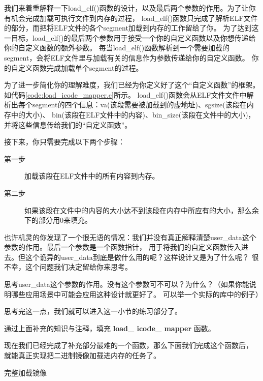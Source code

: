 我们来着重解释一下load\_elf()函数的设计，以及最后两个参数的作用。为了让你有机会完成加载可执行文件到内存的过程，
load\_elf()函数只完成了解析ELF文件的部分，而把将ELF文件的各个segment加载到内存的工作留给了你。
为了达到这一目标，load\_elf()的最后两个参数用于接受一个你的自定义函数以及你想传递给你的自定义函数的额外参数。
每当load\_elf()函数解析到一个需要加载的segment，会将ELF文件里与加载有关的信息作为参数传递给你的自定义函数。
你的自定义函数完成加载单个segment的过程。

为了进一步简化你的理解难度，我们已经为你定义好了这个“自定义函数”的框架。如代码\ref{code:load_icode_mapper.c}所示。
load\_elf()函数会从ELF文件文件中解析出每个segment的四个信息：va(该段需要被加载到的虚地址)、sgsize(该段在内存中的大小)、
bin(该段在ELF文件中的内容)、bin\_size(该段在文件中的大小)，并将这些信息传给我们的“自定义函数”。

接下来，你只需要完成以下两个步骤：

\begin{description}
  \item[第一步] 加载该段在ELF文件中的所有内容到内存。
  \item[第二步] 如果该段在文件中的内容的大小达不到该段在内存中所应有的大小，那么余下的部分用0来填充。
\end{description}

也许机灵的你发现了一个很无语的情况：我们并没有真正解释清楚user\_data这个参数的作用。最后一个参数是一个函数指针，
用于将我们的自定义函数传入进去。但这个诡异的user\_data到底是做什么用的呢？这样设计又是为了什么呢？
很不幸，这个问题我们决定留给你来思考。

\begin{thinking}\label{think-user-data}
思考user\_data这个参数的作用。没有这个参数可不可以？为什么？（如果你能说明哪些应用场景中可能会应用这种设计就更好了。
可以举一个实际的库中的例子）
\end{thinking}

思考完这一点，我们就可以进入这一小节的练习部分了。

\begin{exercise}
通过上面补充的知识与注释，填充 \textbf{load\_ icode\_ mapper} 函数。
\end{exercise}

现在我们已经完成了补充部分最难的一个函数，那么下面我们完成这个函数后，
就能真正实现把二进制镜像加载进内存的任务了。

\begin{codeBoxWithCaption}{完整加载镜像\label{code:load_icode.c}}
  \inputminted[linenos]{c}{codes/load_icode.c}
\end{codeBoxWithCaption}

